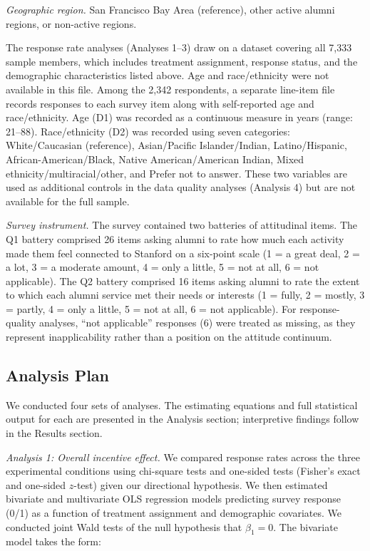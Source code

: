\emph{Geographic region.} San Francisco Bay Area (reference), other active alumni
regions, or non-active regions.

The response rate analyses (Analyses 1--3) draw on a dataset covering all 7,333 sample
members, which includes treatment assignment, response status, and the demographic
characteristics listed above. Age and race/ethnicity were not available in this file.
Among the 2,342 respondents, a separate line-item file records responses to each survey
item along with self-reported age and race/ethnicity. Age (D1) was recorded as a
continuous measure in years (range: 21--88). Race/ethnicity (D2) was recorded using
seven categories: White/Caucasian (reference), Asian/Pacific Islander/Indian,
Latino/Hispanic, African-American/Black, Native American/American Indian, Mixed
ethnicity/multiracial/other, and Prefer not to answer. These two variables are used as
additional controls in the data quality analyses (Analysis 4) but are not available for
the full sample.

\emph{Survey instrument.} The survey contained two batteries of attitudinal items. The
Q1 battery comprised 26 items asking alumni to rate how much each activity made them feel
connected to Stanford on a six-point scale (1 = a great deal, 2 = a lot, 3 = a moderate
amount, 4 = only a little, 5 = not at all, 6 = not applicable). The Q2 battery comprised
16 items asking alumni to rate the extent to which each alumni service met their needs or
interests (1 = fully, 2 = mostly, 3 = partly, 4 = only a little, 5 = not at all, 6 = not
applicable). For response-quality analyses, ``not applicable'' responses (6) were treated
as missing, as they represent inapplicability rather than a position on the attitude
continuum.

\subsection{Analysis Plan}

We conducted four sets of analyses. The estimating equations and full statistical output
for each are presented in the Analysis section; interpretive findings follow in the
Results section.

\emph{Analysis 1: Overall incentive effect.} We compared response rates across the three
experimental conditions using chi-square tests and one-sided tests (Fisher's exact and
one-sided $z$-test) given our directional hypothesis. We then estimated bivariate and
multivariate OLS regression models predicting survey response (0/1) as a function of
treatment assignment and demographic covariates. We conducted joint Wald tests of the
null hypothesis that $\beta_1 = 0$. The bivariate model takes the form:

